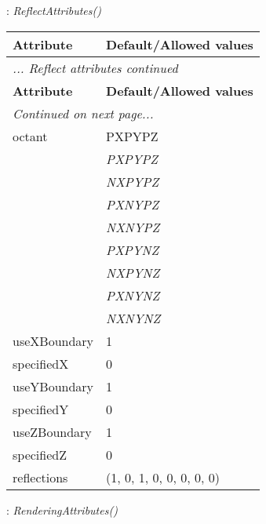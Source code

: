 \documentclass[10pt,a4paper]{report}
\begin{document}
\newpage

{}
: {\it ReflectAttributes() }\\[-3mm]

\begin{longtable}{ll}
{\bf Attribute} & {\bf Default/Allowed values} \\
\hline \hline
\endfirsthead
\multicolumn{2}{l}{{\it ... Reflect attributes continued}} \\
{\bf Attribute} & {\bf Default/Allowed values} \\
\hline \hline
\endhead
\hline
\multicolumn{2}{l}{{\it Continued on next page...}} \\
\endfoot
\hline
\endlastfoot

octant  &  PXPYPZ   \\
 & {\it  PXPYPZ} \\
 & {\it  NXPYPZ} \\
 & {\it  PXNYPZ} \\
 & {\it  NXNYPZ} \\
 & {\it  PXPYNZ} \\
 & {\it  NXPYNZ} \\
 & {\it  PXNYNZ} \\
 & {\it  NXNYNZ} \\
useXBoundary  &  1 \\
specifiedX  &  0 \\
useYBoundary  &  1 \\
specifiedY  &  0 \\
useZBoundary  &  1 \\
specifiedZ  &  0 \\
reflections  &  (1, 0, 1, 0, 0, 0, 0, 0) \\
\end{longtable}

\newpage

{}
: {\it RenderingAttributes() }\\[-3mm]
\end{document}
